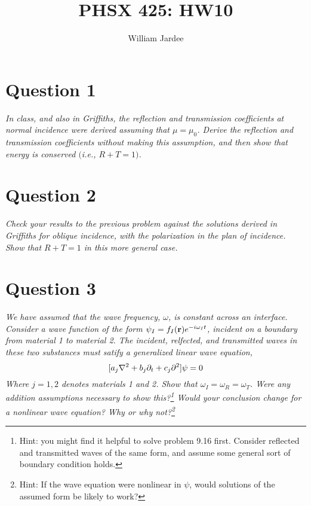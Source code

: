 \documentclass[12pt]{article}
\begin{document}
\title{PHSX 425: HW10}
\author{William Jardee}
\maketitle

\section*{Question 1}
\emph{In class, and also in Griffiths, the reflection and transmission coefficients at normal incidence were derived assuming that $\mu = \mu_0$. Derive the reflection and transmission coefficients without making this assumption, and then show that energy is conserved $($i.e., $R + T = 1)$.}



\newpage

\section*{Question 2}
\emph{Check your results to the previous problem against the solutions derived in Griffiths for oblique incidence, with the polarization in the plan of incidence. Show that $R + T = 1$ in this more general case.}



\newpage

\section*{Question 3}
\emph{We have assumed that the wave frequency, $\omega$, is constant across an interface. Consider a wave function of the form $\psi_I = f_I(\vb{r})e^{-i\omega_I t}$, incident on a boundary from material 1 to material 2. The incident, relfected, and transmitted waves in these two substances must satify a generalized linear wave equation,}
\[[a_j\laplacian + b_j \partial_t + c_j\partial^2]\psi = 0\]
\emph{Where $j=1,2$ denotes materials 1 and 2. Show that $\omega_I = \omega_R =\omega_T$. Were any addition assumptions necessary to show this?\footnote{Hint: you might find it helpful to solve problem 9.16 first. Consider reflected and transmitted waves of the same form, and assume some general sort of boundary condition holds.} Would your conclusion change for a nonlinear wave equation? Why or why not?\footnote{Hint: If the wave equation were nonlinear in $\psi$, would solutions of the assumed form be likely to work?}}
\end{document}
